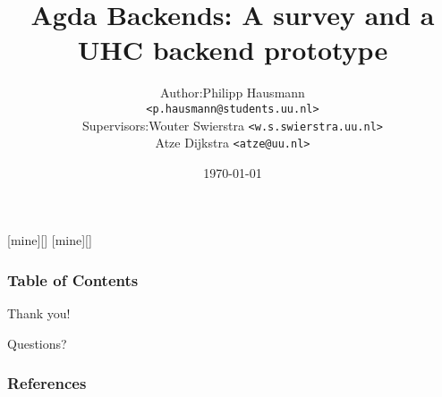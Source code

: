 \documentclass[english]{beamer}
\title[Agda UHC Backend]{Agda Backends: A survey and a UHC backend prototype}
\date{\today}
\institute[Utrecht University] {
    Department of Information and Computing Sciences \\
    Utrecht University
}
\begin{document}
    \author[P. Hausmann]{
        \begin{tabular}{r@{ }l}
            Author:     & Philipp Hausmann \\
                        & \small{\texttt{<p.hausmann@students.uu.nl>}} \\[2ex]
            Supervisors: & Wouter Swierstra \small{\texttt{<w.s.swierstra.uu.nl>}}\\
                        & Atze Dijkstra \small{\texttt{<atze@uu.nl>}}
        \end{tabular}
    }

    [mine][]
    [mine][]

    \begin{frame}
        \titlepage
    \end{frame}

    \begin{frame}
        \frametitle{Table of Contents}
        \tableofcontents
    \end{frame}


    
    
    
%    
%    
%    
%    
%    


    \begin{frame}[plain]
        \begin{center}
            \par{\Huge{Thank you!}}
            \vspace{\baselineskip}
            \par{\Huge{Questions?}}


        \end{center}
    \end{frame}

    \nocite{*}
    \begin{frame}[t,allowframebreaks]
        \frametitle{References}
%        
        \printbibliography
    \end{frame}
\end{document}
